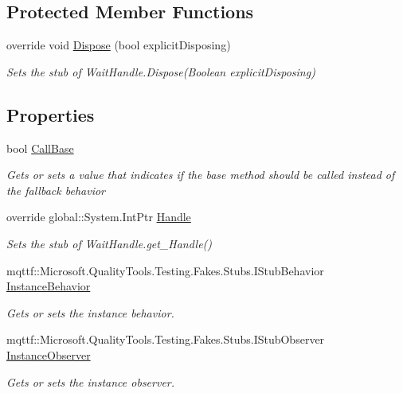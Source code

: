 \subsection*{Protected Member Functions}
\begin{DoxyCompactItemize}
\item 
override void \hyperlink{class_system_1_1_threading_1_1_fakes_1_1_stub_event_wait_handle_a2fca1606ddb42e69c18b74d4bbc78977}{Dispose} (bool explicit\-Disposing)
\begin{DoxyCompactList}\small\item\em Sets the stub of Wait\-Handle.\-Dispose(\-Boolean explicit\-Disposing)\end{DoxyCompactList}\end{DoxyCompactItemize}
\subsection*{Properties}
\begin{DoxyCompactItemize}
\item 
bool \hyperlink{class_system_1_1_threading_1_1_fakes_1_1_stub_event_wait_handle_a7664175d85b4149d279f78854c1629ae}{Call\-Base}
\begin{DoxyCompactList}\small\item\em Gets or sets a value that indicates if the base method should be called instead of the fallback behavior\end{DoxyCompactList}\item 
override global\-::\-System.\-Int\-Ptr \hyperlink{class_system_1_1_threading_1_1_fakes_1_1_stub_event_wait_handle_a6da0ecf5ec64e5461b117bced2054de5}{Handle}
\begin{DoxyCompactList}\small\item\em Sets the stub of Wait\-Handle.\-get\-\_\-\-Handle()\end{DoxyCompactList}\item 
mqttf\-::\-Microsoft.\-Quality\-Tools.\-Testing.\-Fakes.\-Stubs.\-I\-Stub\-Behavior \hyperlink{class_system_1_1_threading_1_1_fakes_1_1_stub_event_wait_handle_a6fee6e49abc2cde6be7ad4bec8bfecd4}{Instance\-Behavior}
\begin{DoxyCompactList}\small\item\em Gets or sets the instance behavior.\end{DoxyCompactList}\item 
mqttf\-::\-Microsoft.\-Quality\-Tools.\-Testing.\-Fakes.\-Stubs.\-I\-Stub\-Observer \hyperlink{class_system_1_1_threading_1_1_fakes_1_1_stub_event_wait_handle_a912c3977ab86a5c66c5538ebd114fcb1}{Instance\-Observer}
\begin{DoxyCompactList}\small\item\em Gets or sets the instance observer.\end{DoxyCompactList}\end{DoxyCompactItemize}


